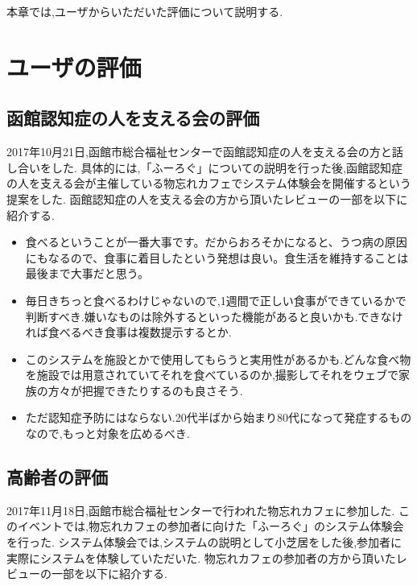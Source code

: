 \documentclass[../report]{subfiles}
\begin{document}
本章では,ユーザからいただいた評価について説明する.

\section{ユーザの評価}
\subsection{函館認知症の人を支える会の評価}
2017年10月21日,函館市総合福祉センターで函館認知症の人を支える会の方と話し合いをした.
具体的には,「ふーろぐ」についての説明を行った後,函館認知症の人を支える会が主催している物忘れカフェでシステム体験会を開催するという提案をした.
函館認知症の人を支える会の方から頂いたレビューの一部を以下に紹介する.


\begin{itemize}
    \item 食べるということが一番大事です。だからおろそかになると、うつ病の原因にもなるので、食事に着目したという発想は良い。食生活を維持することは最後まで大事だと思う。
    \item 毎日きちっと食べるわけじゃないので,1週間で正しい食事ができているかで判断すべき.嫌いなものは除外するといった機能があると良いかも.できなければ食べるべき食事は複数提示するとか.
    \item このシステムを施設とかで使用してもらうと実用性があるかも.どんな食べ物を施設では用意されていてそれを食べているのか,撮影してそれをウェブで家族の方々が把握できたりするのも良さそう.
    \item ただ認知症予防にはならない.20代半ばから始まり80代になって発症するものなので,もっと対象を広めるべき.
\end{itemize}

\subsection{高齢者の評価}
2017年11月18日,函館市総合福祉センターで行われた物忘れカフェに参加した.
このイベントでは,物忘れカフェの参加者に向けた「ふーろぐ」のシステム体験会を行った.
システム体験会では,システムの説明として小芝居をした後,参加者に実際にシステムを体験していただいた.
物忘れカフェの参加者の方から頂いたレビューの一部を以下に紹介する.
\end{document}
